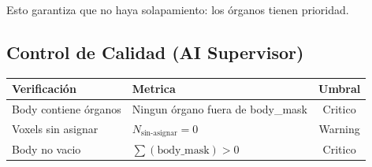 \documentclass[12pt,a4paper]{article}
\begin{document}
Esto garantiza que no haya solapamiento: los órganos tienen prioridad.


\begin{tcolorbox}[aiSupervisor]
\subsection*{Control de Calidad (AI Supervisor)}

\begin{table}[H]
\centering
\begin{tabular}{llc}
\toprule
\textbf{Verificación} & \textbf{Metrica} & \textbf{Umbral} \\
\midrule
Body contiene órganos & Ningun órgano fuera de body\_mask & Critico \\
Voxels sin asignar & $N_{\text{sin-asignar}} = 0$ & Warning \\
Body no vacio & $\sum(\text{body\_mask}) > 0$ & Critico \\
\bottomrule
\end{tabular}
\end{table}

\newpage


\newpage


\newpage


\newpage


\newpage


\newpage


\newpage


\newpage

\end{tcolorbox}
\end{document}
